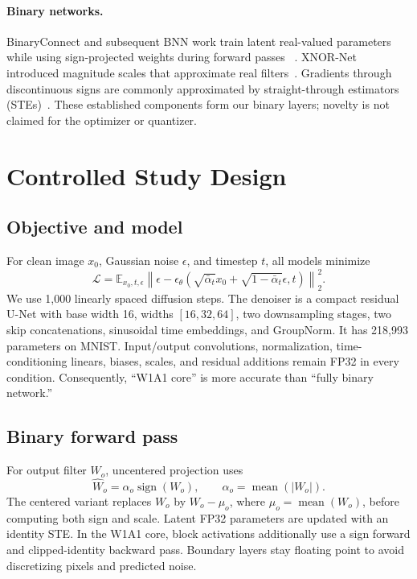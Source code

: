 \documentclass[conference]{IEEEtran}
\begin{document}
\paragraph{Binary networks.}
BinaryConnect and subsequent BNN work train latent real-valued parameters while
using sign-projected weights during forward passes
~\cite{courbariaux2015binaryconnect,hubara2016bnn}. XNOR-Net introduced magnitude
scales that approximate real filters~\cite{rastegari2016xnornet}. Gradients
through discontinuous signs are commonly approximated by straight-through
estimators (STEs)~\cite{bengio2013ste}. These established components form our
binary layers; novelty is not claimed for the optimizer or quantizer.

\section{Controlled Study Design}

\subsection{Objective and model}

For clean image $x_0$, Gaussian noise $\epsilon$, and timestep $t$, all models
minimize
\begin{equation}
\mathcal{L}=\mathbb{E}_{x_0,t,\epsilon}
\left\|\epsilon-\epsilon_\theta
\left(\sqrt{\bar\alpha_t}x_0+
\sqrt{1-\bar\alpha_t}\epsilon,t\right)\right\|_2^2.
\end{equation}
We use 1,000 linearly spaced diffusion steps. The denoiser is a compact residual
U-Net with base width 16, widths $[16,32,64]$, two downsampling stages, two skip
concatenations, sinusoidal time embeddings, and GroupNorm. It has 218,993
parameters on MNIST. Input/output convolutions, normalization, time-conditioning
linears, biases, scales, and residual additions remain FP32 in every condition.
Consequently, ``W1A1 core'' is more accurate than ``fully binary network.''

\subsection{Binary forward pass}

For output filter $W_o$, uncentered projection uses
\begin{equation}
\widehat W_o=\alpha_o\operatorname{sign}(W_o),\qquad
\alpha_o=\operatorname{mean}(|W_o|).
\end{equation}
The centered variant replaces $W_o$ by $W_o-\mu_o$, where
$\mu_o=\operatorname{mean}(W_o)$, before computing both sign and scale. Latent
FP32 parameters are updated with an identity STE. In the W1A1 core, block
activations additionally use a sign forward and clipped-identity backward pass.
Boundary layers stay floating point to avoid discretizing pixels and predicted
noise.
\end{document}
